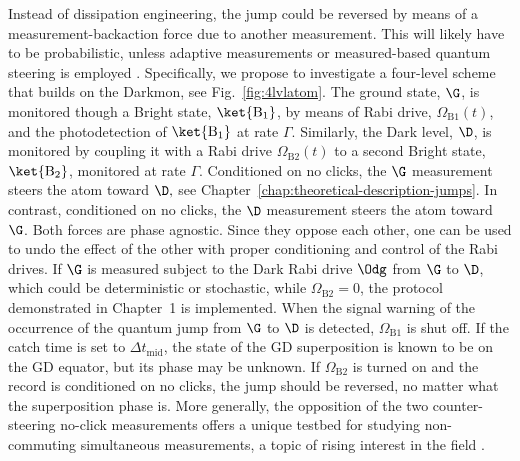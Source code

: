 Instead of dissipation engineering, the jump could be reversed by
means of a measurement-backaction force due to another measurement.
This will likely have to be probabilistic, unless adaptive measurements
\citep{Wiseman1995-adaptive,Jacobs2003-adaptive-msr} or measured-based
quantum steering is employed \citep{schrodinger1935gegenwartige,Murch2013a,Wiseman2007-steering}.
Specifically, we propose to investigate a four-level scheme that builds
on the Darkmon, see Fig.~\ref{fig:4lvlatom}. The ground state, $\G$,
is monitored though a Bright state, $\ket{\mathrm{B}_{1}}$, by means
of Rabi drive, $\Omega_{\mathrm{B1}}\left(t\right)$, and the photodetection
of $\ket{\mathrm{B}_{1}}$ at rate $\Gamma.$ Similarly, the Dark
level, $\D$, is monitored by coupling it with a Rabi drive $\Omega_{\mathrm{B2}}\left(t\right)$
to a second Bright state, $\ket{\mathrm{B}_{2}}$, monitored at rate
$\Gamma.$ Conditioned on no clicks, the $\G$ measurement steers
the atom toward $\D,$ see Chapter~\ref{chap:theoretical-description-jumps}.
In contrast, conditioned on no clicks, the $\D$ measurement steers
the atom toward $\G$. Both forces are phase agnostic. Since they
oppose each other, one can be used to undo the effect of the other
with proper conditioning and control of the Rabi drives. If $\G$
is measured subject to the Dark Rabi drive $\Odg$ from $\G$ to $\D$,
which could be deterministic or stochastic, while $\Omega_{\mathrm{B2}}=0$,
the protocol demonstrated in Chapter~1 is implemented. When the signal
warning of the occurrence of the quantum jump from $\G$ to $\D$
is detected, $\Omega_{\mathrm{B1}}$ is shut off. If the catch time
is set to $\Delta t_{\mathrm{mid}}$, the state of the GD superposition
is known to be on the GD equator, but its phase may be unknown. If
$\Omega_{\mathrm{B2}}$ is turned on and the record is conditioned
on no clicks, the jump should be reversed, no matter what the superposition
phase is. More generally, the opposition of the two counter-steering
no-click measurements offers a unique testbed for studying non-commuting
simultaneous measurements, a topic of rising interest in the field
\citep{Jordan2005-non-coom,Ruskov2010,Hacohen-Gourgy2016-non-comm,Perarnau-Llobet2017,Atalaya2017,Lewalle2017,Patti2017,Ficheux2017,Chantasri2018}. 

